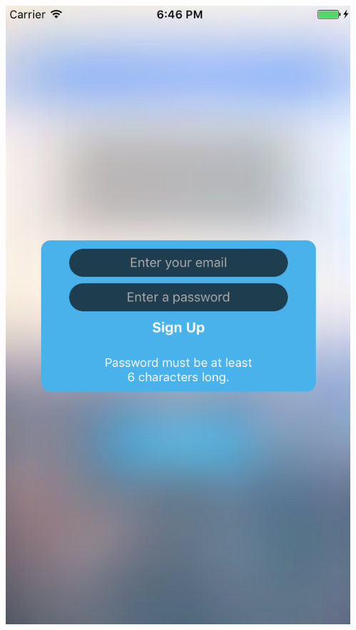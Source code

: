 \documentclass{beamer}
\begin{document}
\begin{frame}
\begin{columns}
\begin{column}{0.3\textwidth}
\begin{center}
        \end{center}
    \end{column}
    \begin{column}{0.3\textwidth}  %
        \begin{center}
            \includegraphics[scale=0.3]{registration}
        \end{center}
    \end{column}
\end{columns}
\end{frame}
\end{document}
